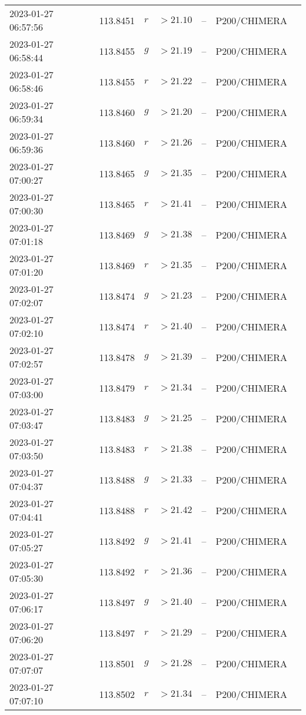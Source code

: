 \documentclass{nature_plusfigure}
\begin{document}
\begin{supplement}
\begin{center}
\begin{longtable}{lllllll}
2023-01-27 06:57:56 & 113.8451 & $r$ & $>21.10$ & -- & P200/CHIMERA &  \\ 
2023-01-27 06:58:44 & 113.8455 & $g$ & $>21.19$ & -- & P200/CHIMERA &  \\ 
2023-01-27 06:58:46 & 113.8455 & $r$ & $>21.22$ & -- & P200/CHIMERA &  \\ 
2023-01-27 06:59:34 & 113.8460 & $g$ & $>21.20$ & -- & P200/CHIMERA &  \\ 
2023-01-27 06:59:36 & 113.8460 & $r$ & $>21.26$ & -- & P200/CHIMERA &  \\ 
2023-01-27 07:00:27 & 113.8465 & $g$ & $>21.35$ & -- & P200/CHIMERA &  \\ 
2023-01-27 07:00:30 & 113.8465 & $r$ & $>21.41$ & -- & P200/CHIMERA &  \\ 
2023-01-27 07:01:18 & 113.8469 & $g$ & $>21.38$ & -- & P200/CHIMERA &  \\ 
2023-01-27 07:01:20 & 113.8469 & $r$ & $>21.35$ & -- & P200/CHIMERA &  \\ 
2023-01-27 07:02:07 & 113.8474 & $g$ & $>21.23$ & -- & P200/CHIMERA &  \\ 
2023-01-27 07:02:10 & 113.8474 & $r$ & $>21.40$ & -- & P200/CHIMERA &  \\ 
2023-01-27 07:02:57 & 113.8478 & $g$ & $>21.39$ & -- & P200/CHIMERA &  \\ 
2023-01-27 07:03:00 & 113.8479 & $r$ & $>21.34$ & -- & P200/CHIMERA &  \\ 
2023-01-27 07:03:47 & 113.8483 & $g$ & $>21.25$ & -- & P200/CHIMERA &  \\ 
2023-01-27 07:03:50 & 113.8483 & $r$ & $>21.38$ & -- & P200/CHIMERA &  \\ 
2023-01-27 07:04:37 & 113.8488 & $g$ & $>21.33$ & -- & P200/CHIMERA &  \\ 
2023-01-27 07:04:41 & 113.8488 & $r$ & $>21.42$ & -- & P200/CHIMERA &  \\ 
2023-01-27 07:05:27 & 113.8492 & $g$ & $>21.41$ & -- & P200/CHIMERA &  \\ 
2023-01-27 07:05:30 & 113.8492 & $r$ & $>21.36$ & -- & P200/CHIMERA &  \\ 
2023-01-27 07:06:17 & 113.8497 & $g$ & $>21.40$ & -- & P200/CHIMERA &  \\ 
2023-01-27 07:06:20 & 113.8497 & $r$ & $>21.29$ & -- & P200/CHIMERA &  \\ 
2023-01-27 07:07:07 & 113.8501 & $g$ & $>21.28$ & -- & P200/CHIMERA &  \\ 
2023-01-27 07:07:10 & 113.8502 & $r$ & $>21.34$ & -- & P200/CHIMERA &  \\ 

\end{longtable}
\end{center}
\end{supplement}
\end{document}
